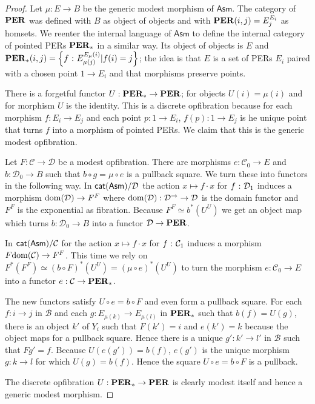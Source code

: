 \documentclass{amsart}
\theoremstyle{plain}
\theoremstyle{definition}
\newcommand\cat\mathcal
\newcommand\set[1]{\left\{#1\right\}}
\newcommand\ri{^*}
\newcommand\Asm{\mathsf{Asm}}
\begin{document}
\begin{proof} Let $\mu:E\to B$ be the generic modest morphism of $\Asm$. The category of $\mathbf{PER}$ was defined with $B$ as object of objects and with $\mathbf{PER}(i,j) = E_j^{E_i}$ as homsets. We reenter the internal language of $\Asm$ to define the internal category of pointed PERs $\mathbf{PER}_*$ in a similar way. Its object of objects is $E$ and $\pers_*(i,j) = \set{f\of E_{\mu(j)}^{E_\mu(i)}| f(i)=j}$; the idea is that $E$ is a set of PERs $E_i$ paired with a chosen point $1\to E_i$ and that morphisms preserve points.

There is a forgetful functor $U:\mathbf{PER}_* \to \mathbf{PER}$; for objects $U(i) = \mu(i)$ and for morphism $U$ is the identity. This is a discrete opfibration because for each morphism $f:E_i \to E_j$ and each point $p:1\to E_i$, $f(p):1\to E_j$ is he unique point that turns $f$ into a morphism of pointed PERs. We claim that this is the generic modest opfibration.

Let $F:\cat C\to \cat D$ be a modest opfibration. There are morphisms $e:\cat C_0\to E$ and $b:\cat D_0\to B$ such that $b\circ g = \mu\circ e$ is a pullback square. We turn these into functors in the following way. In $\catasm/\cat D$  the action $x\mapsto f\cdot x$ for $f\of \cat D_1$ induces a morphism $\dom(\cat D) \to F^F$ where $\dom(\cat D):\cat D^{\to}\to\cat D$ is the domain functor and $F^F$ is the exponential as fibration. Because $F^F \simeq b\ri(U^U)$ we get an object map which turns $b:\cat D_0\to B$ into a functor $\cat D\to\pers$.

In $\catasm/\cat C$ for the action $x\mapsto f\cdot x$ for $f\of \cat C_1$ induces a morphism $F\dom(\cat C) \to F^F$. This time we rely on $F\ri(F^F) \simeq (b\circ F)\ri(U^U) = (\mu\circ e)\ri(U^U)$ to turn the morphism $e:\cat C_0\to E$ into a functor $e:\cat C\to \pers_*$.


The new functors satisfy $U\circ e = b\circ F$ and even form a pullback square. For each $f:i\to j$ in $\cat B$ and each $g:E_{\mu(k)} \to E_{\mu(l)}$ in $\mathbf{PER}_*$ such that $b(f) = U(g)$, there is an object $k'$ of $Y_i$ such that $F(k') = i$ and $e(k') = k$ because the object maps for a pullback square. Hence there is a unique $g':k'\to l'$ in $\cat B$ such that $Fg' = f$. Because $U(e(g')) = b(f)$, $e(g')$ is the unique morphism $g:k\to l$ for which $U(g)=b(f)$. Hence the square $U\circ e = b\circ F$ is a pullback.

The discrete opfibration $U:\mathbf{PER}_*\to\mathbf{PER}$ is clearly modest itself and hence a generic modest morphism.
\end{proof}
\end{document}
